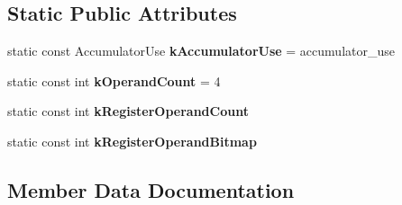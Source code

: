 \subsection*{Static Public Attributes}
\begin{DoxyCompactItemize}
\item 
static const Accumulator\+Use {\bfseries k\+Accumulator\+Use} = accumulator\+\_\+use\hypertarget{structv8_1_1internal_1_1interpreter_1_1_bytecode_traits_3_01accumulator__use_00_01operand__0_00_ad1f88ba519d8dcf4785ba91ce1cb8bd_a830a0092f87bba9dcd12b4f8da5336b5}{}\label{structv8_1_1internal_1_1interpreter_1_1_bytecode_traits_3_01accumulator__use_00_01operand__0_00_ad1f88ba519d8dcf4785ba91ce1cb8bd_a830a0092f87bba9dcd12b4f8da5336b5}

\item 
static const int {\bfseries k\+Operand\+Count} = 4\hypertarget{structv8_1_1internal_1_1interpreter_1_1_bytecode_traits_3_01accumulator__use_00_01operand__0_00_ad1f88ba519d8dcf4785ba91ce1cb8bd_ae914e2c98e9cfa918adc63d206fc2342}{}\label{structv8_1_1internal_1_1interpreter_1_1_bytecode_traits_3_01accumulator__use_00_01operand__0_00_ad1f88ba519d8dcf4785ba91ce1cb8bd_ae914e2c98e9cfa918adc63d206fc2342}

\item 
static const int {\bfseries k\+Register\+Operand\+Count}
\item 
static const int {\bfseries k\+Register\+Operand\+Bitmap}
\end{DoxyCompactItemize}


\subsection{Member Data Documentation}
